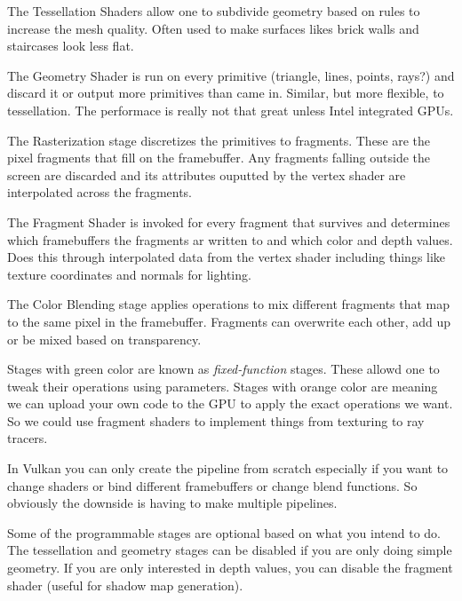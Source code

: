 \par The Tessellation Shaders allow one to subdivide geometry based on rules to increase the mesh quality. Often used to make surfaces likes brick walls and staircases look less flat.

\par The Geometry Shader is run on every primitive (triangle, lines, points, rays?) and discard it or output more primitives than came in. Similar, but more flexible, to tessellation. The performace is really not that great unless Intel integrated GPUs.

\par The Rasterization stage discretizes the primitives to fragments. These are the pixel fragments that fill on the framebuffer. Any fragments falling outside the screen are discarded and its attributes ouputted by the vertex shader are interpolated across the fragments.

\par The Fragment Shader is invoked for every fragment that survives and determines which framebuffers the fragments ar written to and which color and depth values. Does this through interpolated data from the vertex shader including things like texture coordinates and normals for lighting.

\par The Color Blending stage applies operations to mix different fragments that map to the same pixel in the framebuffer. Fragments can overwrite each other, add up or be mixed based on transparency.

\par Stages with green color are known as \emph{fixed-function} stages. These allowd one to tweak their operations using parameters. Stages with orange color are  meaning we can upload your own code to the GPU to apply the exact operations we want. So we could use fragment shaders to implement things from texturing to ray tracers.

\par In Vulkan you can only create the pipeline from scratch especially if you want to change shaders or bind different framebuffers or change blend functions. So obviously the downside is having to make multiple pipelines.

\par Some of the programmable stages are optional based on what you intend to do. The tessellation and geometry stages can be disabled if you are only doing simple geometry. If you are only interested in depth values, you can disable the fragment shader (useful for shadow map generation).

